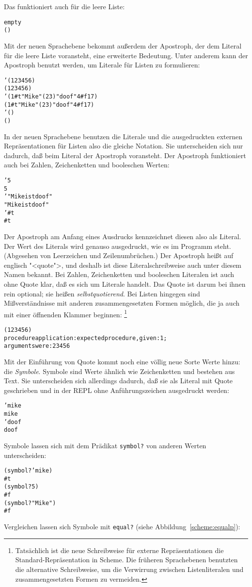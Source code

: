 Das funktioniert auch für die leere Liste:
%
\begin{alltt}
empty
\evalsto{} ()
\end{alltt}
%
Mit der neuen Sprachebene bekommt außerdem der Apostroph, der dem
Literal für die leere Liste voransteht, eine erweiterte Bedeutung.
Unter anderem kann der Apostroph benutzt werden, um Literale für
Listen zu formulieren:
%
\begin{alltt}
'(1 2 3 4 5 6)
\evalsto{} (1 2 3 4 5 6)
'(1 #t "Mike" (2 3) "doof" 4 #f 17)
\evalsto{} (1 #t "Mike" (2 3) "doof" 4 #f 17)
'()
\evalsto{} ()
\end{alltt}
%
In der neuen Sprachebene benutzen die Literale und die ausgedruckten
externen Repräsentationen für Listen also die gleiche
Notation.  Sie unterscheiden sich nur dadurch,
daß beim Literal der Apostroph voransteht.  Der Apostroph funktioniert
auch bei Zahlen, Zeichenketten und booleschen Werten:
%
\begin{alltt}
'5
\evalsto{} 5
'"Mike ist doof"
\evalsto{} "Mike ist doof"
'#t
\evalsto{} #t
\end{alltt}
%
Der Apostroph am Anfang eines Ausdrucks
kennzeichnet diesen also als Literal.  Der Wert des Literals wird 
genauso ausgedruckt, wie es im Programm steht.  (Abgesehen von
Leerzeichen und Zeilenumbrüchen.)  Der Apostroph heißt auf englisch
"<quote">, und deshalb ist diese
Literalschreibweise auch unter diesem Namen bekannt.  Bei Zahlen,
Zeichenketten und booleschen Literalen ist auch ohne Quote klar, daß
es sich um Literale handelt.  Das Quote ist darum bei ihnen rein
optional; sie heißen 
\textit{selbstquotierend}.
Bei Listen hingegen sind Mißverständnisse mit anderen
zusammengesetzten Formen möglich, die ja auch mit einer öffnenden Klammer
beginnen: \footnote{Tatsächlich ist die neue Schreibweise für externe
  Repräsentationen die Standard-Repräsentation in Scheme.  Die
  früheren Sprachebenen benutzten die alternative Schreibweise, um die
  Verwirrung zwischen Listenliteralen und zusammengesetzten Formen zu
  vermeiden.}
\begin{alltt}
(1 2 3 4 5 6)
\evalsto{} procedure application: expected procedure, given: 1;
     arguments were: 2 3 4 5 6
\end{alltt}
%
Mit der Einführung von Quote kommt noch eine völlig neue Sorte Werte
hinzu: die \textit{Symbole}.  Symbole sind Werte ähnlich wie Zeichenketten und
bestehen aus Text.  Sie unterscheiden sich allerdings dadurch, daß sie
als Literal mit Quote geschrieben und in der REPL ohne
Anführungszeichen ausgedruckt werden:
%
\begin{alltt}
'mike
\evalsto{} mike
'doof
\evalsto{} doof
\end{alltt}
%
Symbole lassen sich mit dem Prädikat
\texttt{symbol?} von anderen Werten
unterscheiden:
%
\begin{alltt}
(symbol? 'mike)
\evalsto{} #t
(symbol? 5)
\evalsto{} #f
(symbol? "Mike")
\evalsto{} #f
\end{alltt}
%
Vergleichen lassen sich Symbole mit \texttt{equal?} (siehe
Abbildung~\ref{scheme:equalp}):

